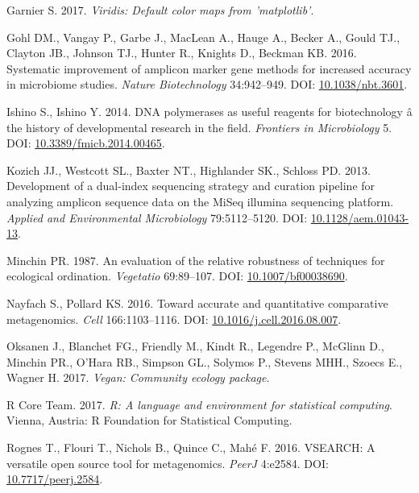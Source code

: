 \documentclass[12pt,]{article}
\begin{document}
\hypertarget{ref-viridis_citation_2017}{}
Garnier S. 2017. \emph{Viridis: Default color maps from 'matplotlib'}.

\hypertarget{ref-taq_Gohl_2016}{}
Gohl DM., Vangay P., Garbe J., MacLean A., Hauge A., Becker A., Gould
TJ., Clayton JB., Johnson TJ., Hunter R., Knights D., Beckman KB. 2016.
Systematic improvement of amplicon marker gene methods for increased
accuracy in microbiome studies. \emph{Nature Biotechnology} 34:942--949.
DOI: \href{https://doi.org/10.1038/nbt.3601}{10.1038/nbt.3601}.

\hypertarget{ref-polymerase_Ishino_2014}{}
Ishino S., Ishino Y. 2014. DNA polymerases as useful reagents for
biotechnology â the history of developmental research in the field.
\emph{Frontiers in Microbiology} 5. DOI:
\href{https://doi.org/10.3389/fmicb.2014.00465}{10.3389/fmicb.2014.00465}.

\hypertarget{ref-protocol_Kozich_2013}{}
Kozich JJ., Westcott SL., Baxter NT., Highlander SK., Schloss PD. 2013.
Development of a dual-index sequencing strategy and curation pipeline
for analyzing amplicon sequence data on the MiSeq illumina sequencing
platform. \emph{Applied and Environmental Microbiology} 79:5112--5120.
DOI: \href{https://doi.org/10.1128/aem.01043-13}{10.1128/aem.01043-13}.

\hypertarget{ref-bc_index_Minchin1987}{}
Minchin PR. 1987. An evaluation of the relative robustness of techniques
for ecological ordination. \emph{Vegetatio} 69:89--107. DOI:
\href{https://doi.org/10.1007/bf00038690}{10.1007/bf00038690}.

\hypertarget{ref-metagenomcis_bias_Nayfach_2016}{}
Nayfach S., Pollard KS. 2016. Toward accurate and quantitative
comparative metagenomics. \emph{Cell} 166:1103--1116. DOI:
\href{https://doi.org/10.1016/j.cell.2016.08.007}{10.1016/j.cell.2016.08.007}.

\hypertarget{ref-vegan_citation}{}
Oksanen J., Blanchet FG., Friendly M., Kindt R., Legendre P., McGlinn
D., Minchin PR., O'Hara RB., Simpson GL., Solymos P., Stevens MHH.,
Szoecs E., Wagner H. 2017. \emph{Vegan: Community ecology package}.

\hypertarget{ref-r_citation_2017}{}
R Core Team. 2017. \emph{R: A language and environment for statistical
computing}. Vienna, Austria: R Foundation for Statistical Computing.

\hypertarget{ref-vsearch_Rognes_2016}{}
Rognes T., Flouri T., Nichols B., Quince C., Mahé F. 2016. VSEARCH: A
versatile open source tool for metagenomics. \emph{PeerJ} 4:e2584. DOI:
\href{https://doi.org/10.7717/peerj.2584}{10.7717/peerj.2584}.
\end{document}
